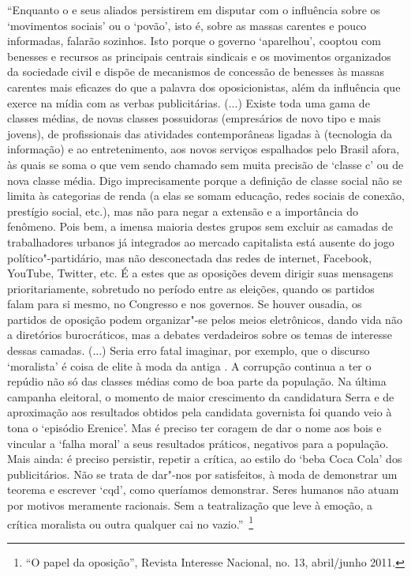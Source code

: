 ``Enquanto o  e seus aliados persistirem em disputar com o 
influência sobre os `movimentos sociais' ou o `povão', isto é, sobre as
massas carentes e pouco informadas, falarão sozinhos. Isto porque o
governo `aparelhou', cooptou com benesses e recursos as principais
centrais sindicais e os movimentos organizados da sociedade civil e
dispõe de mecanismos de concessão de benesses às massas carentes mais
eficazes do que a palavra dos oposicionistas, além da influência que
exerce na mídia com as verbas publicitárias. (...) Existe toda uma gama
de classes médias, de novas classes possuidoras (empresários de novo
tipo e mais jovens), de profissionais das atividades contemporâneas
ligadas à  (tecnologia da informação) e ao entretenimento, aos novos
serviços espalhados pelo Brasil afora, às quais se soma o que vem sendo
chamado sem muita precisão de `classe c' ou de nova classe média. Digo
imprecisamente porque a definição de classe social não se limita às
categorias de renda (a elas se somam educação, redes sociais de conexão,
prestígio social, etc.), mas não para negar a extensão e a importância
do fenômeno. Pois bem, a imensa maioria destes grupos sem excluir as
camadas de trabalhadores urbanos já integrados ao mercado capitalista
está ausente do jogo político"-partidário, mas não desconectada das redes
de internet, Facebook, YouTube, Twitter, etc. É a estes que as oposições
devem dirigir suas mensagens prioritariamente, sobretudo no período
entre as eleições, quando os partidos falam para si mesmo, no Congresso
e nos governos. Se houver ousadia, os partidos de oposição podem
organizar"-se pelos meios eletrônicos, dando vida não a diretórios
burocráticos, mas a debates verdadeiros sobre os temas de interesse
dessas camadas. (...) Seria erro fatal imaginar, por exemplo, que o
discurso `moralista' é coisa de elite à moda da antiga . A corrupção
continua a ter o repúdio não só das classes médias como de boa parte da
população. Na última campanha eleitoral, o momento de maior crescimento
da candidatura Serra e de aproximação aos resultados obtidos pela
candidata governista foi quando veio à tona o `episódio Erenice'. Mas é
preciso ter coragem de dar o nome aos bois e vincular a `falha moral' a
seus resultados práticos, negativos para a população. Mais ainda: é
preciso persistir, repetir a crítica, ao estilo do `beba Coca Cola' dos
publicitários. Não se trata de dar"-nos por satisfeitos, à moda de
demonstrar um teorema e escrever `cqd', como queríamos demonstrar. Seres
humanos não atuam por motivos meramente racionais. Sem a teatralização
que leve à emoção, a crítica moralista ou outra qualquer cai no
vazio.''~\footnote{``O papel da oposição'', Revista Interesse Nacional,
  no. 13, abril/junho 2011.}

